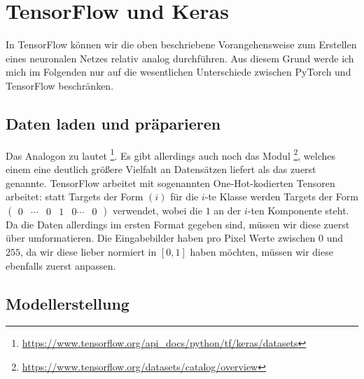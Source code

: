 

\section{TensorFlow und Keras}

In TensorFlow können wir die oben beschriebene Vorangehensweise zum Erstellen eines neuronalen Netzes 
relativ analog durchführen. Aus diesem Grund werde ich mich im Folgenden nur auf die wesentlichen 
Unterschiede zwischen PyTorch und TensorFlow beschränken. 

\subsection{Daten laden und präparieren}



Das Analogon zu  lautet 
\footnote{\url{https://www.tensorflow.org/api_docs/python/tf/keras/datasets}}. 
Es gibt allerdings auch noch das Modul \footnote{\url{https://www.tensorflow.org/datasets/catalog/overview}}, 
welches einem eine deutlich größere Vielfalt an Datensätzen liefert als das zuerst genannte.
TensorFlow arbeitet mit sogenannten One-Hot-kodierten Tensoren arbeitet: statt Targets der Form 
\((i)\) für die \(i\)-te Klasse werden Targets der Form \(\begin{pmatrix}
    0 & \cdots & 0 & 1 & 0 \cdots & 0
\end{pmatrix}\) verwendet, wobei die \(1\) an der \(i\)-ten Komponente steht. 
Da die Daten allerdings im ersten Format gegeben sind, müssen wir diese zuerst über  umformatieren. 
Die Eingabebilder haben pro Pixel Werte zwischen \(0\) und \(255\), da wir diese lieber 
normiert in \([0,1]\) haben möchten, müssen wir diese ebenfalls zuerst anpassen. 

\subsection{Modellerstellung}



